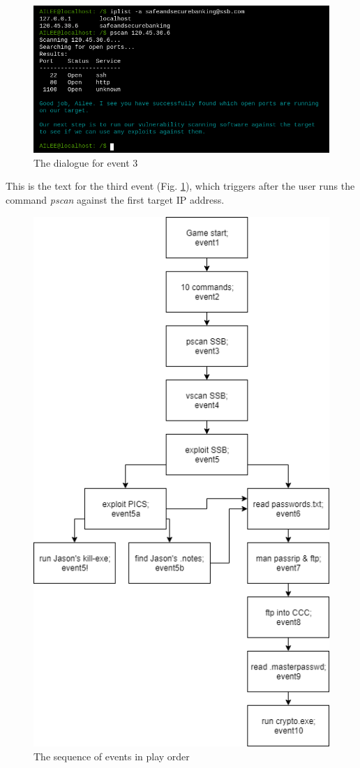 \documentclass[conference]{IEEEtran}
\begin{document}
\begin{figure}[h]
	\centerline{\includegraphics[scale=1.39]{event3}}
	\caption{The dialogue for event 3}
	\label{fig:event3}
\end{figure}

This is the text for the third event (Fig. \ref{fig:event3}), which triggers after the user runs the command \textit{pscan} against the first target IP address.

\begin{figure}[h]
    \centerline{\includegraphics[scale=0.5]{gameflow.png}}
    \caption{The sequence of events in play order}
    \label{fig:gameplay-sequence}
\end{figure}
\end{document}
